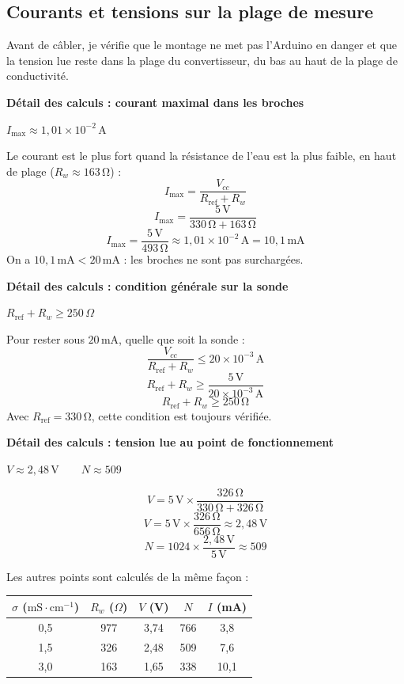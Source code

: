 \documentclass[11pt,a4paper]{article}
\newcommand{\resultat}[1]{\begin{center}{\large\color{bleuENO}$\displaystyle #1$}\end{center}}
\newcommand{\calcul}[2]{\par\medskip\noindent\textbf{Détail des calculs : #1}\par\nopagebreak\resultat{#2}}
\newcommand{\ligne}{\arrayrulecolor{ligneENO}\specialrule{0.4pt}{0pt}{0pt}\arrayrulecolor{black}}
\newcommand{\U}[1]{\,\mathrm{#1}}
\begin{document}
\subsection{Courants et tensions sur la plage de mesure}

Avant de câbler, je vérifie que le montage ne met pas l'Arduino en danger et que la tension lue reste dans la plage du convertisseur, du bas au haut de la plage de conductivité.


\calcul{courant maximal dans les broches}{I_{\max} \approx 1{,}01 \times 10^{-2}\,\mathrm{A}}
Le courant est le plus fort quand la résistance de l'eau est la plus faible, en haut de plage ($R_w \approx 163\U{\Omega}$) :
\[
I_{\max} = \frac{V_{cc}}{R_{\text{ref}} + R_w}
\]
\[
I_{\max} = \frac{5\U{V}}{330\U{\Omega} + 163\U{\Omega}}
\]
\[
I_{\max} = \frac{5\U{V}}{493\U{\Omega}} \approx 1{,}01 \times 10^{-2}\U{A} = 10{,}1\U{mA}
\]
On a $10{,}1\U{mA} < 20\U{mA}$ : les broches ne sont pas surchargées.

\calcul{condition générale sur la sonde}{R_{\text{ref}} + R_w \geq 250\,\Omega}
Pour rester sous $20\U{mA}$, quelle que soit la sonde :
\[
\frac{V_{cc}}{R_{\text{ref}} + R_w} \leq 20 \times 10^{-3}\U{A}
\]
\[
R_{\text{ref}} + R_w \geq \frac{5\U{V}}{20 \times 10^{-3}\U{A}}
\]
\[
R_{\text{ref}} + R_w \geq 250\U{\Omega}
\]
Avec $R_{\text{ref}} = 330\U{\Omega}$, cette condition est toujours vérifiée.

\calcul{tension lue au point de fonctionnement}{V \approx 2{,}48\,\mathrm{V} \qquad N \approx 509}
\[
V = 5\U{V} \times \frac{326\U{\Omega}}{330\U{\Omega} + 326\U{\Omega}}
\]
\[
V = 5\U{V} \times \frac{326\U{\Omega}}{656\U{\Omega}} \approx 2{,}48\U{V}
\]
\[
N = 1024 \times \frac{2{,}48\U{V}}{5\U{V}} \approx 509
\]

Les autres points sont calculés de la même façon :

\begin{center}
\begin{tabular}{c c c c c}
\toprule
\textbf{$\sigma$ ($\mathrm{mS \cdot cm^{-1}}$)} & \textbf{$R_w$ ($\Omega$)} & \textbf{$V$ (V)} & \textbf{$N$} & \textbf{$I$ (mA)} \\
\midrule
0,5 & 977 & 3,74 & 766 & 3,8 \\ \ligne
1,5 & 326 & 2,48 & 509 & 7,6 \\ \ligne
3,0 & 163 & 1,65 & 338 & 10,1 \\
\bottomrule
\end{tabular}
\end{center}
\end{document}
